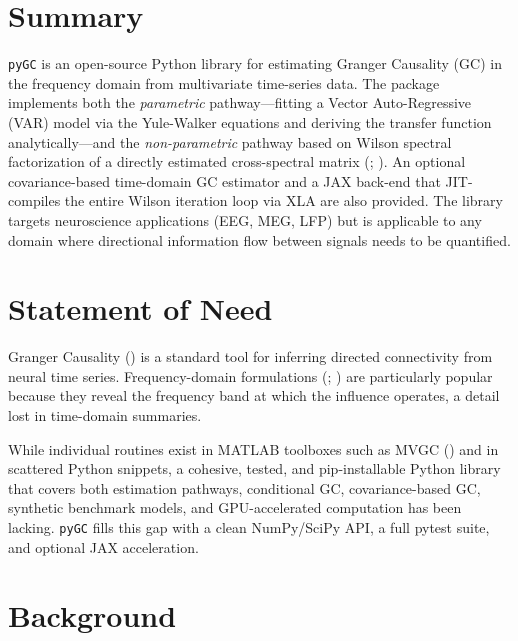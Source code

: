 \documentclass[10pt,a4paper,onecolumn]{article}
\begin{document}
\section{Summary}\label{summary}

\texttt{pyGC} is an open-source Python library for estimating Granger
Causality (GC) in the frequency domain from multivariate time-series
data. The package implements both the \emph{parametric} pathway---fitting
a Vector Auto-Regressive (VAR) model via the Yule-Walker equations and
deriving the transfer function analytically---and the
\emph{non-parametric} pathway based on Wilson spectral factorization of a
directly estimated cross-spectral matrix
(;
).
An optional covariance-based time-domain GC estimator and a JAX back-end
that JIT-compiles the entire Wilson iteration loop via XLA are also
provided. The library targets neuroscience applications (EEG, MEG, LFP)
but is applicable to any domain where directional information flow
between signals needs to be quantified.

\section{Statement of Need}\label{statement-of-need}

Granger Causality () is a
standard tool for inferring directed connectivity from neural time
series. Frequency-domain formulations
(;
) are particularly
popular because they reveal the frequency band at which the influence
operates, a detail lost in time-domain summaries.

While individual routines exist in MATLAB toolboxes such as MVGC
() and in scattered
Python snippets, a cohesive, tested, and pip-installable Python library
that covers both estimation pathways, conditional GC, covariance-based
GC, synthetic benchmark models, and GPU-accelerated computation has been
lacking. \texttt{pyGC} fills this gap with a clean NumPy/SciPy API, a
full pytest suite, and optional JAX acceleration.

\section{Background}\label{background}
\end{document}
